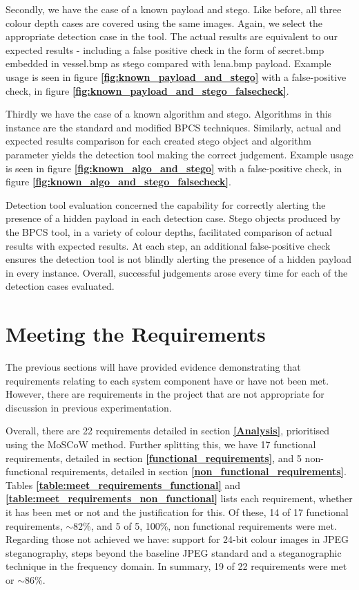 \documentclass{l4proj}
\begin{document}
Secondly, we have the case of a known payload and stego. Like before, all three colour depth cases are covered using the same images. Again, we select the appropriate detection case in the tool. The actual results are equivalent to our expected results - including a false positive check in the form of secret.bmp embedded in vessel.bmp as stego compared with lena.bmp payload. Example usage is seen in figure \textbf{\ref{fig:known_payload_and_stego}} with a false-positive check, in figure \textbf{\ref{fig:known_payload_and_stego_falsecheck}}.

Thirdly we have the case of a known algorithm and stego. Algorithms in this instance are the standard and modified BPCS techniques. Similarly, actual and expected results comparison for each created stego object and algorithm parameter yields the detection tool making the correct judgement. Example usage is seen in figure \textbf{\ref{fig:known_algo_and_stego}} with a false-positive check, in figure \textbf{\ref{fig:known_algo_and_stego_falsecheck}}. 

Detection tool evaluation concerned the capability for correctly alerting the presence of a hidden payload in each detection case. Stego objects produced by the BPCS tool, in a variety of colour depths, facilitated comparison of actual results with expected results. At each step, an additional false-positive check ensures the detection tool is not blindly alerting the presence of a hidden payload in every instance. Overall, successful judgements arose every time for each of the detection cases evaluated.

\section{Meeting the Requirements}

The previous sections will have provided evidence demonstrating that requirements relating to each system component have or have not been met. However, there are requirements in the project that are not appropriate for discussion in previous experimentation.

Overall, there are 22 requirements detailed in section \textbf{\ref{Analysis}}, prioritised using the MoSCoW method.  Further splitting this, we have 17 functional requirements, detailed in section \textbf{\ref{functional_requirements}}, and 5 non-functional requirements, detailed in section \textbf{\ref{non_functional_requirements}}. Tables \textbf{\ref{table:meet_requirements_functional}} and \textbf{\ref{table:meet_requirements_non_functional}} lists each requirement, whether it has been met or not and the justification for this. Of these, 14 of 17 functional requirements, $\sim$82\%, and 5 of 5, 100\%, non functional requirements were met. Regarding those not achieved we have: support for 24-bit colour images in JPEG steganography, steps beyond the baseline JPEG standard and a steganographic technique in the frequency domain. In summary, 19 of 22 requirements were met or $\sim$86\%.
\end{document}
